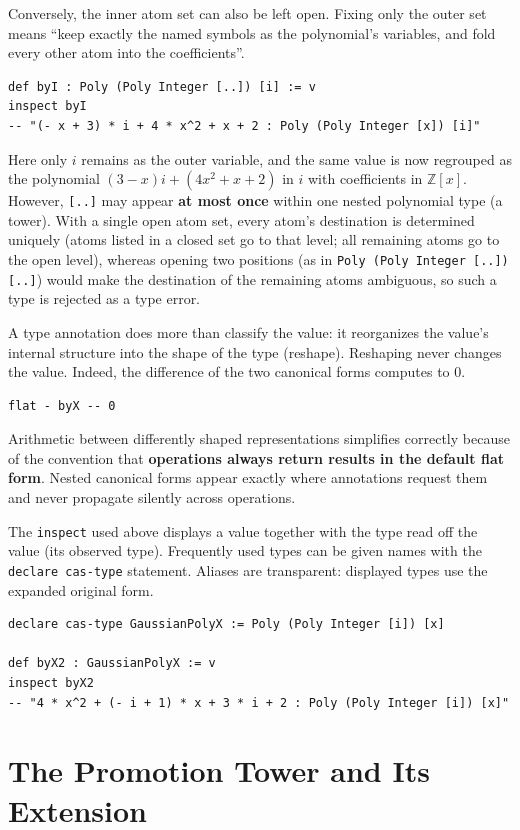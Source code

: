 Conversely, the inner atom set can also be left open.
Fixing only the outer set means ``keep exactly the named symbols as the polynomial's variables, and fold every other atom into the coefficients''.
\begin{lstlisting}[language=egison,numbers=none]
def byI : Poly (Poly Integer [..]) [i] := v
inspect byI
-- "(- x + 3) * i + 4 * x^2 + x + 2 : Poly (Poly Integer [x]) [i]"
\end{lstlisting}
Here only $i$ remains as the outer variable, and the same value is now regrouped as the polynomial $(3 - x)i + (4x^2 + x + 2)$ in $i$ with coefficients in $\mathbb{Z}[x]$.
However, \lstinline{[..]} may appear \textbf{at most once} within one nested polynomial type (a tower).
With a single open atom set, every atom's destination is determined uniquely (atoms listed in a closed set go to that level; all remaining atoms go to the open level), whereas opening two positions (as in \lstinline{Poly (Poly Integer [..]) [..]}) would make the destination of the remaining atoms ambiguous, so such a type is rejected as a type error.

A type annotation does more than classify the value: it reorganizes the value's internal structure into the shape of the type (reshape).
Reshaping never changes the value.
Indeed, the difference of the two canonical forms computes to $0$.
\begin{lstlisting}[language=egison,numbers=none]
flat - byX -- 0
\end{lstlisting}
Arithmetic between differently shaped representations simplifies correctly because of the convention that \textbf{operations always return results in the default flat form}.
Nested canonical forms appear exactly where annotations request them and never propagate silently across operations.

The \lstinline{inspect} used above displays a value together with the type read off the value (its observed type).
Frequently used types can be given names with the \lstinline{declare cas-type} statement.
Aliases are transparent: displayed types use the expanded original form.
\begin{lstlisting}[language=egison,numbers=none]
declare cas-type GaussianPolyX := Poly (Poly Integer [i]) [x]

def byX2 : GaussianPolyX := v
inspect byX2
-- "4 * x^2 + (- i + 1) * x + 3 * i + 2 : Poly (Poly Integer [i]) [x]"
\end{lstlisting}

\section{The Promotion Tower and Its Extension}\label{cas-subtype}


